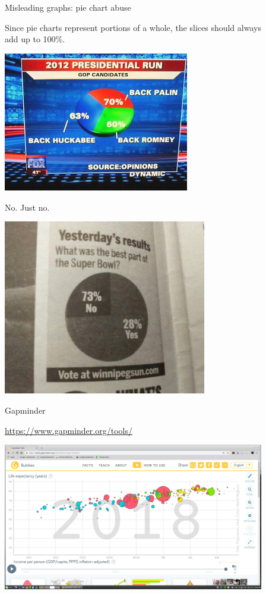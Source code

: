 \documentclass[handout]{beamer}
\begin{document}
\begin{frame}{Misleading graphs: pie chart abuse}
\begin{block}{}
Since pie charts represent portions of a whole, the slices should always\\ add up to 100\%.
\end{block}
\pause
\begin{center}
\includegraphics[width=3.2in]{../images/ch02_bad_piechart}
\end{center}

\end{frame}

\begin{frame}{No. Just no.}
\begin{center}
\includegraphics[width=3.5in]{../images/ch02_sb_piechart}
\end{center}
\end{frame}

\begin{frame}{Gapminder}

\url{https://www.gapminder.org/tools/}

\begin{center}
\includegraphics[width=4.5in]{../images/ch02_gapminder}
\end{center}


\end{frame}
\end{document}
